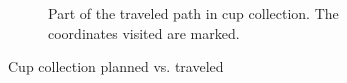 \begin{figure}[ht]
\begin{subfigure}[t]{0.3\textwidth}
    \caption{Part of the traveled path in cup collection. The coordinates visited are marked.}
    \label{cup_collect_robot}
  \end{subfigure}
\caption{Cup collection planned vs. traveled}
\label{cup_collection_results}
\end{figure}